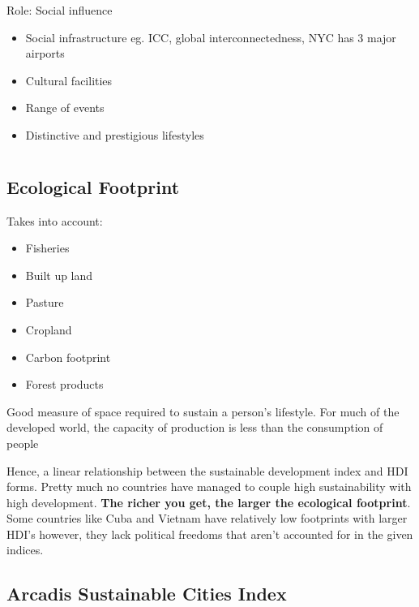 	Role: Social influence
	\begin{itemize}
		\item Social infrastructure eg. ICC, global interconnectedness, NYC has 3 major airports
		\item Cultural facilities
		\item Range of events
		\item Distinctive and prestigious lifestyles
	\end{itemize}


\section{}

	\subsection{Ecological Footprint}
	
		Takes into account:
		\begin{itemize}
			\item Fisheries
			\item Built up land
			\item Pasture
			\item Cropland
			\item Carbon footprint
			\item Forest products
		\end{itemize}

		Good measure of space required to sustain a person's lifestyle. For much of the developed world, the capacity of production is less than the consumption of people

		Hence, a linear relationship between the sustainable development index and HDI forms. Pretty much no countries have managed to couple high sustainability with high development. \textbf{The richer you get, the larger the ecological footprint}. Some countries like Cuba and Vietnam have relatively low footprints with larger HDI's however, they lack political freedoms that aren't accounted for in the given indices.
	
	\subsection{Arcadis Sustainable Cities Index}
	
